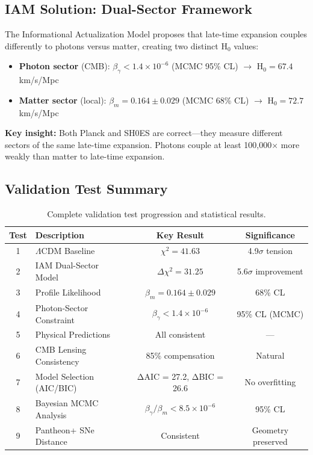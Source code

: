 \documentclass[11pt,letterpaper]{article}
\begin{document}
\subsection{IAM Solution: Dual-Sector Framework}

The Informational Actualization Model proposes that late-time expansion couples differently to photons versus matter, creating two distinct H$_0$ values:

\begin{itemize}
\item \textbf{Photon sector} (CMB): $\beta_\gamma < 1.4 \times 10^{-6}$ (MCMC 95\% CL) $\rightarrow$ H$_0 = 67.4$ km/s/Mpc
\item \textbf{Matter sector} (local): $\beta_m = 0.164 \pm 0.029$ (MCMC 68\% CL) $\rightarrow$ H$_0 = 72.7$ km/s/Mpc
\end{itemize}

\noindent\textbf{Key insight:} Both Planck and SH0ES are correct—they measure different sectors of the same late-time expansion. Photons couple at least 100,000$\times$ more weakly than matter to late-time expansion.

\subsection{Validation Test Summary}

\begin{table}[h]
\centering
\begin{tabular}{clcc}
\toprule
Test & Description & Key Result & Significance \\
\midrule
1 & $\Lambda$CDM Baseline & $\chi^2 = 41.63$ & 4.9$\sigma$ tension \\
2 & IAM Dual-Sector Model & $\Delta\chi^2 = 31.25$ & 5.6$\sigma$ improvement \\
3 & Profile Likelihood & $\beta_m = 0.164 \pm 0.029$ & 68\% CL \\
4 & Photon-Sector Constraint & $\beta_\gamma < 1.4 \times 10^{-6}$ & 95\% CL (MCMC) \\
5 & Physical Predictions & All consistent & — \\
6 & CMB Lensing Consistency & 85\% compensation & Natural \\
7 & Model Selection (AIC/BIC) & ΔAIC = 27.2, ΔBIC = 26.6 & No overfitting \\
8 & Bayesian MCMC Analysis & $\beta_\gamma/\beta_m < 8.5 \times 10^{-6}$ & 95\% CL \\
9 & Pantheon+ SNe Distance & Consistent & Geometry preserved \\
\bottomrule
\end{tabular}
\caption{Complete validation test progression and statistical results.}
\end{table}
\end{document}
